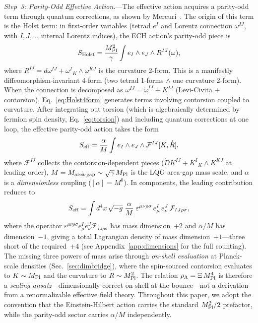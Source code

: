 \documentclass[aps,prd,twocolumn,superscriptaddress,showpacs,preprintnumbers,nofootinbib,longbibliography,floatfix]{revtex4-2}
\newcommand{\MPl}{M_{\rm Pl}}
\begin{document}
\textit{Step~3: Parity-Odd Effective Action.}---The effective action acquires a parity-odd term through quantum corrections, as shown by Mercuri~\cite{Mercuri2009}. The origin of this term is the Holst term: in first-order variables (tetrad $e^I$ and Lorentz connection $\omega^{IJ}$, with $I,J,\dots$ internal Lorentz indices), the ECH action's parity-odd piece is
\begin{equation}\label{eq:Holst4form}
S_{\rm Holst} = \frac{\MPl^2}{\gamma}\int e_I\wedge e_J\wedge R^{IJ}(\omega),
\end{equation}
where $R^{IJ}=d\omega^{IJ}+\omega^{I}_{\;\;K}\wedge\omega^{KJ}$ is the curvature 2-form. This is a manifestly diffeomorphism-invariant 4-form (two tetrad 1-forms $\wedge$ one curvature 2-form). When the connection is decomposed as $\omega^{IJ}=\mathring{\omega}^{IJ}+K^{IJ}$ (Levi-Civita $+$ contorsion), Eq.~\eqref{eq:Holst4form} generates terms involving contorsion coupled to curvature. After integrating out torsion (which is algebraically determined by fermion spin density, Eq.~\ref{eq:torsion}) and including quantum corrections at one loop, the effective parity-odd action takes the form
\begin{equation}\label{eq:Seff}
S_{\rm eff} = \frac{\alpha}{M}\int e_I\wedge e_J\wedge \mathcal{F}^{IJ}[K,\mathring{R}],
\end{equation}
where $\mathcal{F}^{IJ}$ collects the contorsion-dependent pieces ($\mathring{D}K^{IJ}+K^{I}_{\;\;K}\wedge K^{KJ}$ at leading order), $M = M_{\rm area\text{-}gap}\sim\sqrt{\gamma}\,\MPl$ is the LQG area-gap mass scale, and $\alpha$ is a \textit{dimensionless} coupling ($[\alpha]=M^0$). In components, the leading contribution reduces to
\begin{equation}\label{eq:Seff_comp}
S_{\rm eff} = \int d^4x\,\sqrt{-g}\;\frac{\alpha}{M}\;\varepsilon^{\mu\nu\rho\sigma}\,e^I_\mu\,e^J_\nu\,\mathcal{F}_{IJ\rho\sigma},
\end{equation}
where the operator $\varepsilon^{\mu\nu\rho\sigma}e^I_\mu e^J_\nu\mathcal{F}_{IJ\rho\sigma}$ has mass dimension~$+2$ and $\alpha/M$ has dimension~$-1$, giving a total Lagrangian density of mass dimension~$+1$---three short of the required~$+4$ (see Appendix~\ref{app:dimensions} for the full counting). The missing three powers of mass arise through \textit{on-shell evaluation} at Planck-scale densities (Sec.~\ref{sec:dimbridge}), where the spin-sourced contorsion evaluates to $K\sim\MPl$ and the curvature to $R\sim\MPl^2$. The relation $\rho_\Lambda = \Xi\,\MPl^4$ is therefore a \textit{scaling ansatz}---dimensionally correct on-shell at the bounce---not a derivation from a renormalizable effective field theory. Throughout this paper, we adopt the convention that the Einstein-Hilbert action carries the standard $\MPl^2/2$ prefactor, while the parity-odd sector carries $\alpha/M$ independently.
\end{document}
